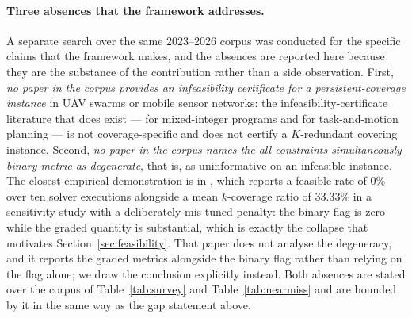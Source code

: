 \documentclass[conference]{IEEEtran}
\begin{document}
\paragraph{Three absences that the framework addresses.}
A separate search over the same 2023--2026 corpus was conducted for the specific claims that the framework makes, and the absences are reported here because they are the substance of the contribution rather than a side observation. First, \emph{no paper in the corpus provides an infeasibility certificate for a persistent-coverage instance} in UAV swarms or mobile sensor networks: the infeasibility-certificate literature that does exist --- for mixed-integer programs and for task-and-motion planning --- is not coverage-specific and does not certify a $K$-redundant covering instance. Second, \emph{no paper in the corpus names the all-constraints-simultaneously binary metric as degenerate}, that is, as uninformative on an infeasible instance. The closest empirical demonstration is in \cite{lee2026}, which reports a feasible rate of 0\% over ten solver executions alongside a mean $k$-coverage ratio of 33.33\% in a sensitivity study with a deliberately mis-tuned penalty: the binary flag is zero while the graded quantity is substantial, which is exactly the collapse that motivates Section~\ref{sec:feasibility}. That paper does not analyse the degeneracy, and it reports the graded metrics alongside the binary flag rather than relying on the flag alone; we draw the conclusion explicitly instead. Both absences are stated over the corpus of Table~\ref{tab:survey} and Table~\ref{tab:nearmiss} and are bounded by it in the same way as the gap statement above.
\end{document}
